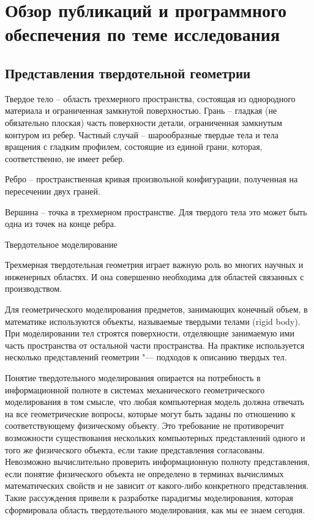 \chapter{Обзор публикаций и программного обеспечения по теме исследования} \label{chapt1}


\section{Представления твердотельной геометрии} \label{sect1_1}

Твердое тело – область трехмерного пространства, состоящая из однородного материала и ограниченная замкнутой поверхностью.
Грань – гладкая (не обязательно плоская) часть поверхности детали, ограниченная замкнутым контуром из ребер. Частный случай – шарообразные твердые тела и тела вращения с гладким профилем, состоящие из единой грани, которая, соответственно, не имеет ребер.

Ребро – пространственная кривая произвольной конфигурации, полученная на пересечении двух граней.

Вершина – точка в трехмерном пространстве. Для твердого тела это может быть одна из точек на конце ребра.

Твердотельное моделирование

Трехмерная твердотельная геометрия играет важную роль во многих научных и инженерных областях. И она совершенно необходима для областей связанных с производством.

Для геометрического моделирования предметов, занимающих конечный объем, в математике используются объекты, называемые твердыми телами (rigid body). При моделировании тел строятся поверхности, отделяющие занимаемую ими часть пространства от остальной части пространства. На практике используется несколько представлений геометрии "--- подходов к описанию твердых тел.

Понятие твердотельного моделирования опирается на потребность в информационной полноте в системах механического геометрического моделирования в том смысле, что любая компьютерная модель должна отвечать на все геометрические вопросы, которые могут быть заданы по отношению к соответствующему физическому объекту. Это требование не противоречит возможности существования нескольких компьютерных представлений одного и того же физического объекта, если такие представления согласованы. Невозможно вычислительно проверить информационную полноту представления, если понятие физического объекта не определено в терминах вычислимых математических свойств и не зависит от какого-либо конкретного представления. Такие рассуждения привели к разработке парадигмы моделирования, которая сформировала область твердотельного моделирования, как мы ее знаем сегодня.

